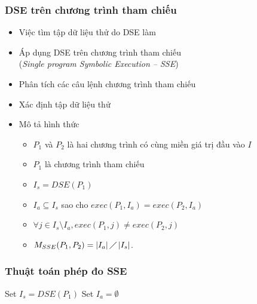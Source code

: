 \documentclass{beamer}
\begin{document}
\begin{frame}
  \frametitle{DSE trên chương trình tham chiếu}
  \begin{itemize}
  	\item Việc tìm tập dữ liệu thử do DSE làm
  	\item Áp dụng DSE trên chương trình tham chiếu
  	\\ (\emph{Single program Symbolic Execution -- SSE})
  	\item Phân tích các câu lệnh chương trình tham chiếu
  	\item Xác định tập dữ liệu thử
  	\item Mô tả hình thức
  	\begin{itemize}
	\item $P_{1}$ và $P_{2}$ là hai chương trình có cùng miền giá trị đầu
	vào $I$
	\item $P_{1}$ là chương trình tham chiếu
	\item $I_{s} = DSE(P_{1})$
	\item $I_{a} \subseteq I_s$ sao cho
	$exec(P_{1}, I_a) = exec(P_{2}, I_a)$
	\item $\forall j \in I_{s} \setminus I_{a}, exec(P_{1}, j) \neq
	exec(P_{2}, j)$
	\item $M_{SSE}(P_{1}, P_{2}) = \left|I_{a}\right| \diagup
	\left|I_{s}\right| $.
  	\end{itemize}
  \end{itemize}
\end{frame}


\begin{frame}
  \frametitle{Thuật toán phép đo SSE}
  \begin{algorithm}[H]
  	Set $I_{s} = DSE(P_{1})$ \;
  	Set $I_{a} = \emptyset$ \;
  	{  			
  	}
  \end{algorithm}
\end{frame}
\end{document}
